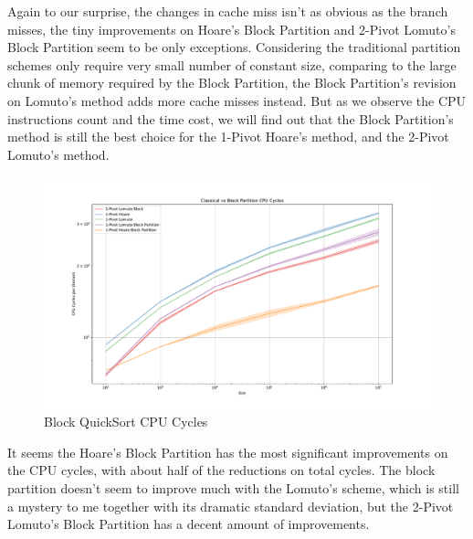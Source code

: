 \documentclass{article}
\begin{document}
Again to our surprise, the changes in cache miss isn't as obvious as the branch misses, the tiny improvements on Hoare's Block Partition and 2-Pivot Lomuto's Block Partition seem to be only exceptions.
Considering the traditional partition schemes only require very small number of constant size, comparing to the large chunk of memory required by the Block Partition, the Block Partition's revision on Lomuto's method adds more cache misses instead.
But as we observe the CPU instructions count and the time cost, we will find out that the Block Partition's method is still the best choice for the 1-Pivot Hoare's method, and the 2-Pivot Lomuto's method.

\begin{figure}[H]
    \hypertarget{fig:blockcpucycles}{}
    \caption{Block QuickSort CPU Cycles}
    \centering
    \hspace*{-0.27\textwidth}
    \includegraphics[width=1.5\textwidth]{Classical vs Block Partition CPU Cycles.pdf}
\end{figure}

It seems the Hoare's Block Partition has the most significant improvements on the CPU cycles, with about half of the reductions on total cycles.
The block partition doesn't seem to improve much with the Lomuto's scheme, which is still a mystery to me together with its dramatic standard deviation, but the 2-Pivot Lomuto's Block Partition has a decent amount of improvements.
\end{document}
